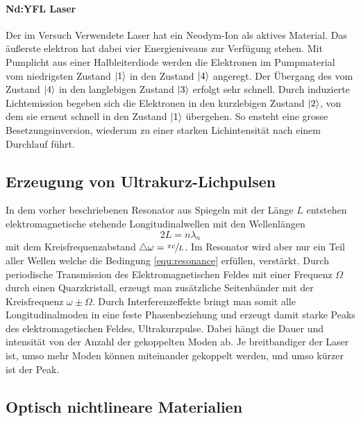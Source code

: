 \paragraph{Nd:YFL Laser}
Der im Versuch Verwendete Laser hat ein Neodym-Ion als aktives Material.
Das äußerste elektron hat dabei vier Energieniveaus zur Verfügung stehen.
Mit Pumplicht aus einer Halbleiterdiode werden die Elektronen im Pumpmaterial
vom niedrigsten Zustand $\ket{1}$ in den Zustand $\ket{4}$ angeregt. Der Übergang des
vom Zustand $\ket{4}$ in den langlebigen Zustand $\ket{3}$ erfolgt sehr
schnell. Durch induzierte Lichtemission begeben sich die Elektronen in den kurzlebigen
Zustand $\ket{2}$, von dem sie erneut schnell in den Zustand $\ket{1}$ übergehen.
So ensteht eine grosse Besetzungsinversion, wiederum zu einer starken Lichintensität
nach einem Durchlauf führt.

\subsection{Erzeugung von Ultrakurz-Lichpulsen}
In dem vorher beschriebenen Resonator aus Spiegeln mit der Länge $L$
entstehen elektromagnetische stehende Longitudinalwellen mit den Wellenlängen
\begin{equation}
  2L = n\lambda_n
  \label{equ:resonance}
\end{equation}
mit dem Kreisfrequenzabstand $\triangle \omega = \sfrac{\pi c}{L}$.
Im Resonator wird aber nur ein Teil aller Wellen welche die Bedingung \ref{equ:resonance}
erfüllen, verstärkt. Durch periodische Transmission des Elektromagnetischen Feldes mit einer
Frequenz $\Omega$ durch einen Quarzkristall, erzeugt man zusätzliche Seitenbänder mit
der Kreisfrequenz $\omega \pm \Omega$.
Durch Interferenzeffekte bringt man somit alle Longitudinalmoden in eine feste Phasenbeziehung
und erzeugt damit starke Peaks des elektromagetischen Feldes, Ultrakurzpulse.
Dabei hängt die Dauer und intensität von der Anzahl der gekoppelten Moden ab.
Je breitbandiger der Laser ist, umso mehr Moden können miteinander gekoppelt werden,
und umso kürzer ist der Peak.

\subsection{Optisch nichtlineare Materialien}



